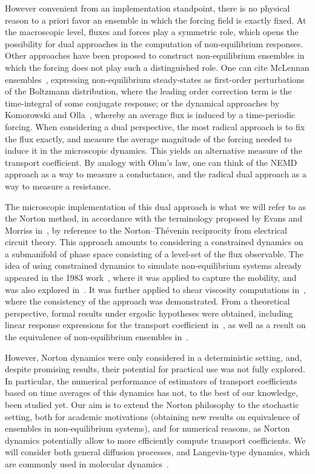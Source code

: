 However convenient from an implementation standpoint, there is no physical reason to a priori favor an ensemble in which the forcing field is exactly fixed. At the macroscopic level, fluxes and forces play a symmetric role, which opens the possibility for dual approaches in the computation of non-equilibrium responses. Other approaches have been proposed to construct non-equilibrium ensembles in which the forcing does not play such a distinguished role. One can cite McLennan ensembles~\cite{MK10}, expressing non-equilibrium steady-states as first-order perturbations of the Boltzmann distribution, where the leading order correction term is the time-integral of some conjugate response; or the dynamical approaches by Komorowski and Olla~\cite{KLOS22}, whereby an average flux is induced by a time-periodic forcing. When considering a dual perspective, the most radical approach is to fix the flux exactly, and measure the average magnitude of the forcing needed to induce it in the microscopic dynamics. This yields an alternative measure of the transport coefficient. By analogy with Ohm's law, one can think of the NEMD approach as a way to measure a conductance, and the radical dual approach as a way to measure a resistance.

The microscopic implementation of this dual approach is what we will refer to as the Norton method, in accordance with the terminology proposed by Evans and Morriss in~\cite{EM85}, by reference to the Norton--Th\'evenin reciprocity from electrical circuit theory. This approach amounts to considering a constrained dynamics on a submanifold of phase space consisting of a level-set of the flux observable. The idea of using constrained dynamics to simulate non-equilibrium systems already appeared in the 1983 work~\cite{EHFML83}, where it was applied to capture the mobility,
and was also explored in~\cite{HPC93}. It was further applied to shear viscosity computations in~\cite{EE86}, where the consistency of the approach was demonstrated. From a theoretical perspective, formal results under ergodic hypotheses were obtained, including linear response expressions for the transport coefficient in~\cite{EM85}, as well as a result on the equivalence of non-equilibrium ensembles in~\cite{E93}.

However, Norton dynamics were only considered in a deterministic setting, and, despite promising results, their potential for practical use was not fully explored. In particular, the numerical performance of estimators of transport coefficients based on time averages of this dynamics has not, to the best of our knowledge, been studied yet. Our aim is to extend the Norton philosophy to the stochastic setting, both for academic motivations (obtaining new results on equivalence of ensembles in non-equilibrium systems), and for numerical reasons, as Norton dynamics potentially allow to more efficiently compute transport coefficients. We will consider both general diffusion processes, and Langevin-type dynamics, which are commonly used in molecular dynamics~\cite{P14}.

